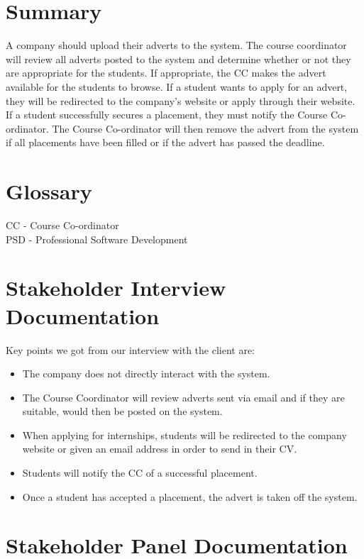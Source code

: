\documentclass{l3deliverable}
\begin{document}
\section{Summary}

A company should upload their adverts to the system. The course coordinator will review
all adverts posted to the system and determine whether or not they are appropriate for the
students. If appropriate, the CC makes the advert available for the students to browse. If a student
wants to apply for an advert, they will be redirected to the company's website or apply through their website. If
a student successfully secures a placement, they must notify the Course Co-ordinator. The Course Co-ordinator will then remove the advert from the system if all placements have been filled or if the advert has passed the deadline.

\appendix

\section{Glossary}
CC - Course Co-ordinator\\
PSD - Professional Software Development

\section{Stakeholder Interview Documentation}

Key points we got from our interview with the client are:

\begin{itemize}
\item The company does not directly interact with the system.
\item The Course Coordinator will review adverts sent via email and if they are suitable, would
then be posted on the system.
\item When applying for internships, students will be redirected to the company website or given
an email address in order to send in their CV.
\item Students will notify the CC of a successful placement.
\item Once a student has accepted a placement, the advert is taken off the system.
\end{itemize}

\section{Stakeholder Panel Documentation}
\end{document}
